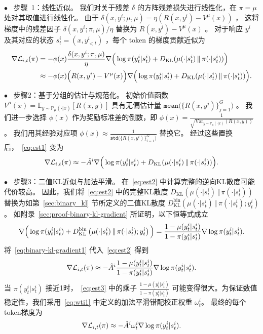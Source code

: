 \documentclass[11pt]{article}
\theoremstyle{definition}
\def\eql#1#2{\begin{equation}{#1}\begin{split}#2\end{split}\end{equation}}
\def\pr#1{\left( #1 \right ) }
\def\br#1{\left[ #1 \right ] }
\def\calL{\mathcal{L}}
\newcommand\na{\nabla}
\def\prb#1{\big( #1 \big)}
\def\prB#1{\Big( #1 \Big)}
\def\KL#1#2{D_{\mathrm{KL}}(#1 \,\Vert\, #2)}
\newcommand\Eb{\mathbb{E}}
\newcommand\wt{\omega}
\newcommand\adv{\hat{A}}
\newcommand\cmu{\mathbb{P}_{\mu}}
\begin{document}
\vspace{0.2cm}
\noindent$\bullet$ ~步骤~1：线性近似。  
我们对关于残差 $\delta$ 的方阵残差损失进行线性化，在 $\pi=\mu$ 处对其取值进行线性化。  
由于 $\delta(x,y^i;\mu,\mu) = \eta\pr{R(x,y^i)-V^\mu(x)}$ ，  
这将梯度中的残差因子 $\delta(x,y^i;\pi,\mu)/\eta$ 替换为 $R(x,y^i)-V^\mu(x)$ 。  
对于响应 $y^i$ 及其对应的状态 $s_t^i = (x, y_{<t}^i)$ ，每个 token 的梯度贡献近似为  
\eql{\label{eq:est1}}{
    \na \calL_{i,t}(\pi) 
    &= -\phi(x)\frac{\delta(x, y^i; \pi, \mu)}{\eta}\na\prB{\log\pi(y_t^i | s_t^i) + \KL{\mu(\cdot | s_t^i)}{\pi(\cdot | s_t^i)}} \\  
    &\approx -\phi(x)\prB{R(x, y^i) - V^\mu(x)}\na\prB{\log\pi(y_t^i | s_t^i) + \KL{\mu(\cdot | s_t^i)}{\pi(\cdot | s_t^i)}}.
}

\noindent$\bullet$ ~步骤2：基于分组的估计与规范化。  
初始价值函数 $V^\mu(x) = \Eb_{y\sim\cmu(\cdot | x)}\br{R(x, y)}$ 
具有无偏估计量 $\texttt{mean}\prb{\{R(x, y^j)\}_{j=1}^{G}}$ 。  
我们进一步选择 $\phi(x)$ 作为奖励标准差的倒数，即 $\phi(x) = \frac{1}{\sqrt{\text{Var}_{y\sim \cmu(\cdot|x)}(R(x, y))}}$ 。 我们用其经验对应项 $\phi(x) \approx \frac{1}{\texttt{std}\prb{\{R(x, y^i)\}_{i=1}^G}}$ 替换它。  
经过这些置换后，~\eqref{eq:est1} 变为
\eql{\label{eq:est2}}{
    \na \calL_{i,t}(\pi) \approx 
    - \adv^i \na\prB{\log\pi(y_t^i | s_t^i) + \KL{\mu(\cdot | s_t^i)}{\pi(\cdot | s_t^i)}}.
}

\noindent$\bullet$ ~步骤3：二值KL近似与加法平滑。  
在~\eqref{eq:est2} 中计算完整的逆向KL散度可能代价较高。  
因此，我们将~\eqref{eq:est2} 中的完整KL散度 $\KL{\mu(\cdot | s_t^i)}{\pi(\cdot | s_t^i)}$ 替换为如第~\ref{sec:binary_kl} 节所定义的二值KL散度 $D^{\mathrm{bin}}_{\mathrm{KL}}\pr{\mu(\cdot | s_t^i) \,\Vert\, \pi(\cdot | s_t^i); y_t^i}$。  
如附录~\ref{sec:proof-binary-kl-gradient} 所证明，以下恒等式成立  
\eql{\label{eq:binary-kl-gradient1}}{
    \na\prB{\log\pi(y_t^i | s_t^i) + D^{\mathrm{bin}}_{\mathrm{KL}}\pr{\mu(\cdot | s_t^i) \,\Vert\, \pi(\cdot | s_t^i); y_t^i}}={\frac{1 - \mu(y_t^i | s_t^i)}{1 - \pi(y_t^i | s_t^i)}}\na\log\pi(y_t^i | s_t^i).
}  
将~\eqref{eq:binary-kl-gradient1} 代入~\eqref{eq:est2} 得到  
\eql{\label{eq:est3}}{
    \na \calL_{i,t}(\pi) \approx  - \adv^i{\frac{1 - \mu(y_t^i | s_t^i)}{1 - \pi(y_t^i | s_t^i)}}\na \log\pi(y_t^i | s_t^i).
}  
当 $\pi(y_t^i | s_t^i)$ 接近1时，~\eqref{eq:est3} 中的乘子 $\frac{1 - \mu(y_t^i | s_t^i)}{1 - \pi(y_t^i | s_t^i)}$ 可能变得很大。为保证数值稳定性，我们采用~\eqref{eq:wti1} 中定义的加法平滑错配校正权重 $\wt_t^i$。   
最终的每个token梯度为  
\eql{\label{eq:est4}}{
    \na \calL_{i,t}(\pi) 
    \approx -\adv^i\wt_t^i\na\log\pi(y_t^i | s_t^i).
}
\end{document}
